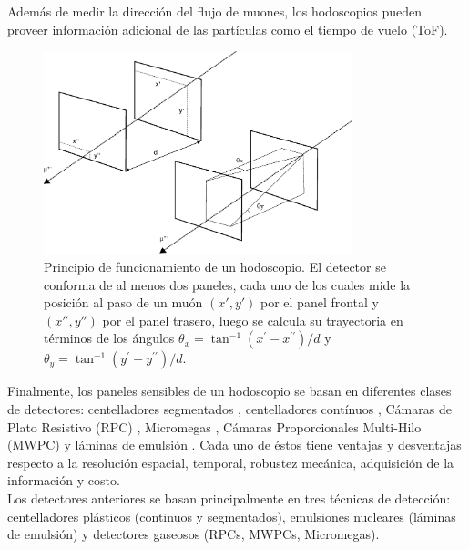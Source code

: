 Además de medir la dirección del flujo de muones, los hodoscopios pueden proveer información adicional de las partículas como el tiempo de vuelo (ToF).\\

\begin{figure}[h!]
\begin{center}
\includegraphics[width=0.8\textwidth]{Figures/Hodoscopio}
\caption[Principio de funcionamiento de un hodoscopio]{Principio de funcionamiento de un hodoscopio. El detector se conforma de al menos dos paneles, cada uno de los cuales mide la posición al paso de un muón $(x',y')$ por el panel frontal y $(x'',y'')$ por el panel trasero, luego se calcula su trayectoria en términos de los ángulos $\theta_x=\tan^{-1} (x^\prime - x^{\prime\prime})/d$ y $\theta_y=\tan^{-1} (y^\prime - y^{\prime\prime})/d$.}
\label{Hodoscopio}
\end{center}
\end{figure}

Finalmente, los paneles sensibles de un hodoscopio se basan en diferentes clases de detectores: centelladores segmentados \cite{Fujii2013, Lesparre2012, Tanaka2009}, centelladores contínuos \cite{Nagamine1995, Aguiar2015, Tang2016}, Cámaras de Plato Resistivo (RPC) \cite{Sehgal2016, Fehr2012}, Micromegas \cite{Bouteille2016}, Cámaras Proporcionales Multi-Hilo (MWPC) \cite{Olh2018} y láminas de emulsión \cite{Morishima2017, NAGAMINE2016}. Cada uno de éstos tiene ventajas y desventajas respecto a la resolución espacial, temporal, robustez mecánica, adquisición de la información y costo.\\

Los detectores anteriores se basan principalmente en tres técnicas de detección: centelladores plásticos (continuos y segmentados), emulsiones nucleares (láminas de emulsión) y detectores gaseosos (RPCs, MWPCs, Micromegas).

